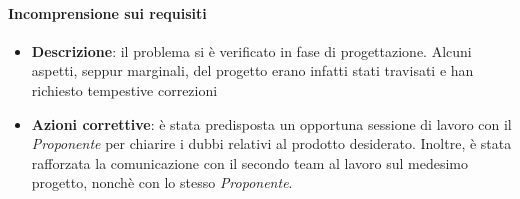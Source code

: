 \paragraph{Incomprensione sui requisiti}
\begin{itemize}
	\item \textbf{Descrizione}: il problema si è verificato in fase di progettazione. Alcuni aspetti, seppur marginali, del progetto erano infatti stati travisati e han richiesto tempestive correzioni
	\item \textbf{Azioni correttive}: è stata predisposta un opportuna sessione di lavoro con il \textit{Proponente} per chiarire i dubbi relativi al prodotto desiderato. Inoltre, è stata rafforzata la comunicazione con il secondo team al lavoro sul medesimo progetto, nonchè con lo stesso \textit{Proponente}.
\end{itemize}
